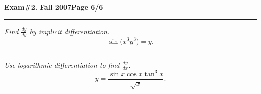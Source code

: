 \documentclass[12pt]{article}
\begin{document}
\hfill{\large\bf Exam\#2.}\hfill{\large\bf
  Fall 2007}\hfill{\large\bf Page 6/6}\hrule

\bigskip
{\problem[10 pts] \em Find $\displaystyle{\frac{dy}{dy}}$ by implicit differentiation.}
\begin{equation*}
\sin \big( x^3 y^3 \big) = y.
\end{equation*}
\vspace{6cm}
\begin{flushright}
\end{flushright}
\hrule
{\problem[10 pts] \em Use logarithmic differentiation to find $\displaystyle{\frac{dy}{dx}}$.}
\begin{equation*}
y = \frac{\sin x \cos x \tan^3 x}{\sqrt{x}}.
\end{equation*}
\vspace{4cm}
\begin{flushright}
\end{flushright}
\end{document}
